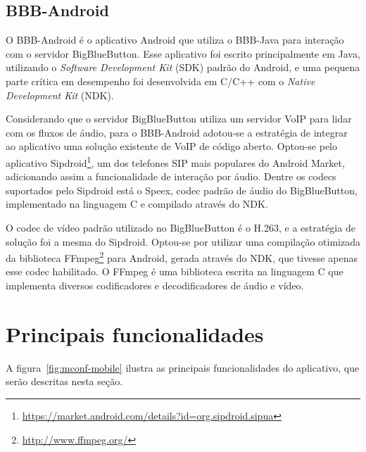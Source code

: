 \documentclass{acm_proc_article-sp}
\begin{document}
\subsection{BBB-Android}\label{subsec:bbb-android}

O BBB-Android é o aplicativo Android que utiliza o BBB-Java para interação com o servidor BigBlueButton. Esse aplicativo foi escrito principalmente em Java, utilizando o \emph{Software Development Kit} (SDK) padrão do Android, e uma pequena parte crítica em desempenho foi desenvolvida em C/C++ com o \emph{Native Development Kit} (NDK).

Considerando que o servidor BigBlueButton utiliza um servidor VoIP para lidar com os fluxos de áudio, para o BBB-Android adotou-se a estratégia de integrar ao aplicativo uma solução existente de VoIP de código aberto. Optou-se pelo aplicativo Sipdroid\footnote{\url{https://market.android.com/details?id=org.sipdroid.sipua}}, um dos telefones SIP mais populares do Android Market, adicionando assim a funcionalidade de interação por áudio. Dentre os codecs suportados pelo Sipdroid está o Speex, codec padrão de áudio do BigBlueButton, implementado na linguagem C e compilado através do NDK.

O codec de vídeo padrão utilizado no BigBlueButton é o H.263, e a estratégia de solução foi a mesma do Sipdroid. Optou-se por utilizar uma compilação otimizada da biblioteca FFmpeg\footnote{\url{http://www.ffmpeg.org/}} para Android, gerada através do NDK, que tivesse apenas esse codec habilitado. O FFmpeg é uma biblioteca escrita na linguagem C que implementa diversos codificadores e decodificadores de áudio e vídeo.

\section{Principais funcionalidades}

A figura~\ref{fig:mconf-mobile} ilustra as principais funcionalidades do aplicativo, que serão descritas nesta seção.
\end{document}
